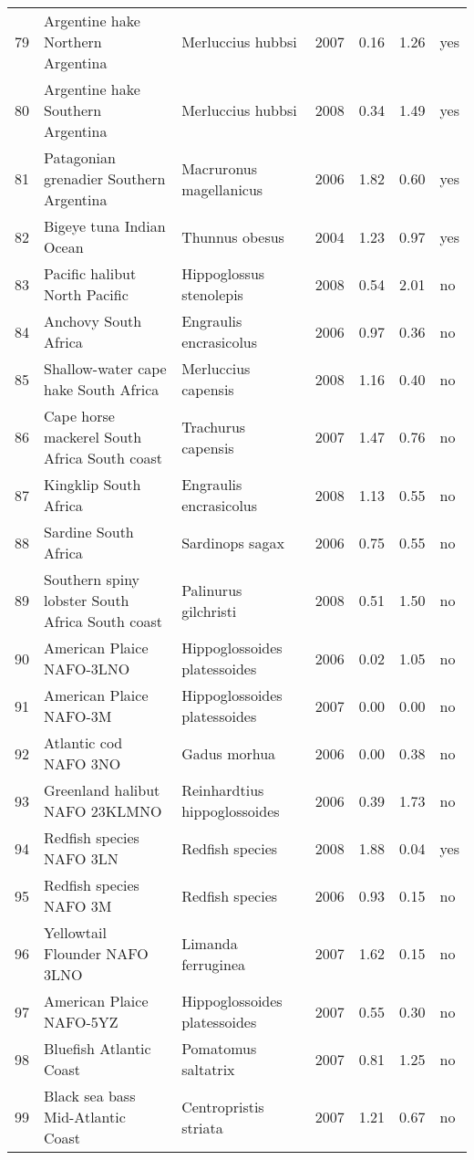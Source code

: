 \begin{table}[ht]
\begin{center}
\begin{tabular}{rllrrrl}
  79 & Argentine hake Northern Argentina & Merluccius hubbsi & 2007 & 0.16 & 1.26 & yes \\
  80 & Argentine hake Southern Argentina & Merluccius hubbsi & 2008 & 0.34 & 1.49 & yes \\
  81 & Patagonian grenadier Southern Argentina & Macruronus magellanicus & 2006 & 1.82 & 0.60 & yes \\
  82 & Bigeye tuna Indian Ocean & Thunnus obesus & 2004 & 1.23 & 0.97 & yes \\
  83 & Pacific halibut North Pacific & Hippoglossus stenolepis & 2008 & 0.54 & 2.01 & no \\
  84 & Anchovy South Africa & Engraulis encrasicolus & 2006 & 0.97 & 0.36 & no \\
  85 & Shallow-water cape hake South Africa & Merluccius capensis & 2008 & 1.16 & 0.40 & no \\
  86 & Cape horse mackerel South Africa South coast & Trachurus capensis & 2007 & 1.47 & 0.76 & no \\
  87 & Kingklip South Africa & Engraulis encrasicolus & 2008 & 1.13 & 0.55 & no \\
  88 & Sardine South Africa & Sardinops sagax & 2006 & 0.75 & 0.55 & no \\
  89 & Southern spiny lobster South Africa South coast & Palinurus gilchristi & 2008 & 0.51 & 1.50 & no \\
  90 & American Plaice NAFO-3LNO & Hippoglossoides platessoides & 2006 & 0.02 & 1.05 & no \\
  91 & American Plaice NAFO-3M & Hippoglossoides platessoides & 2007 & 0.00 & 0.00 & no \\
  92 & Atlantic cod NAFO 3NO & Gadus morhua & 2006 & 0.00 & 0.38 & no \\
  93 & Greenland halibut NAFO 23KLMNO & Reinhardtius hippoglossoides & 2006 & 0.39 & 1.73 & no \\
  94 & Redfish species NAFO 3LN & Redfish species & 2008 & 1.88 & 0.04 & yes \\
  95 & Redfish species NAFO 3M & Redfish species & 2006 & 0.93 & 0.15 & no \\
  96 & Yellowtail Flounder NAFO 3LNO & Limanda ferruginea & 2007 & 1.62 & 0.15 & no \\
  97 & American Plaice NAFO-5YZ & Hippoglossoides platessoides & 2007 & 0.55 & 0.30 & no \\
  98 & Bluefish Atlantic Coast & Pomatomus saltatrix & 2007 & 0.81 & 1.25 & no \\
  99 & Black sea bass Mid-Atlantic Coast & Centropristis striata & 2007 & 1.21 & 0.67 & no \\

\end{tabular}
\end{center}
\end{table}
